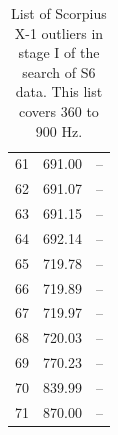 \begin{table}
\begin{center}
\begin{tabular}{r r l}
61 & 691.00 & -- \\
62 & 691.07 & -- \\
63 & 691.15 & -- \\
64 & 692.14 & -- \\
65 & 719.78 & -- \\
66 & 719.89 & -- \\
67 & 719.97 & -- \\
68 & 720.03 & -- \\
69 & 770.23 & -- \\
70 & 839.99 & -- \\
71 & 870.00 & -- \\
\end{tabular}
\caption{List of Scorpius X-1 outliers in stage I of the search of S6 data. This list covers 360 to 900 Hz.}
\label{ScoX1S6outlierTableHF1}
\end{center}
\end{table}

